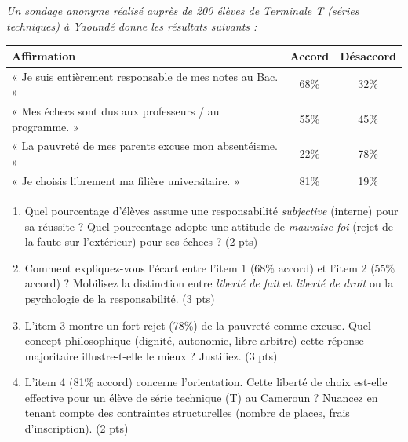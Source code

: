 \documentclass[11pt]{article}
\begin{document}
\begin{exercice}
    \textit{Un sondage anonyme réalisé auprès de 200 élèves de Terminale T (séries techniques) à Yaoundé donne les résultats suivants :}
    \begin{center}
        \begin{tabular}{|l|c|c|}
            \hline
            \textbf{Affirmation} & \textbf{Accord} & \textbf{Désaccord} \\
            \hline
            « Je suis entièrement responsable de mes notes au Bac. » & 68\% & 32\% \\
            \hline
            « Mes échecs sont dus aux professeurs / au programme. » & 55\% & 45\% \\
            \hline
            « La pauvreté de mes parents excuse mon absentéisme. » & 22\% & 78\% \\
            \hline
            « Je choisis librement ma filière universitaire. » & 81\% & 19\% \\
            \hline
        \end{tabular}
    \end{center}
    \begin{enumerate}
        \item Quel pourcentage d'élèves assume une responsabilité \textit{subjective} (interne) pour sa réussite ? Quel pourcentage adopte une attitude de \textit{mauvaise foi} (rejet de la faute sur l'extérieur) pour ses échecs ? (2 pts)
        \item Comment expliquez-vous l'écart entre l'item 1 (68\% accord) et l'item 2 (55\% accord) ? Mobilisez la distinction entre \textit{liberté de fait} et \textit{liberté de droit} ou la psychologie de la responsabilité. (3 pts)
        \item L'item 3 montre un fort rejet (78\%) de la pauvreté comme excuse. Quel concept philosophique (dignité, autonomie, libre arbitre) cette réponse majoritaire illustre-t-elle le mieux ? Justifiez. (3 pts)
        \item L'item 4 (81\% accord) concerne l'orientation. Cette liberté de choix est-elle effective pour un élève de série technique (T) au Cameroun ? Nuancez en tenant compte des contraintes structurelles (nombre de places, frais d'inscription). (2 pts)
    \end{enumerate}
\end{exercice}
\end{document}
